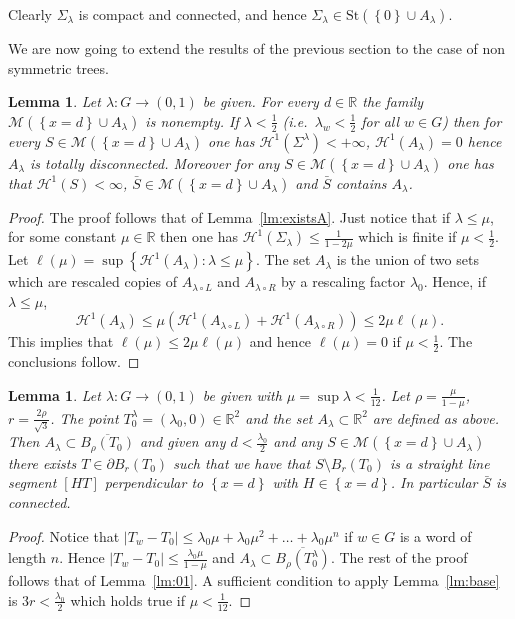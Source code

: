 \documentclass{amsart}
\newcommand{\RR}{\mathbb R}
\renewcommand{\H}{\mathcal H}
\newcommand{\abs}[1]{\left\vert #1 \right\vert}
\newcommand{\ENCLOSE}[1]{\left\{#1\right\}}
\newcommand{\St}{\mathrm{St}}
\newcommand{\M}{\mathcal{M}}
\renewcommand{\H}{\mathcal{H}}
\newtheorem{lemma}[theorem]{Lemma}
\theoremstyle{definition}
\theoremstyle{remark}
\begin{document}
Clearly $\Sigma_\lambda$ is compact and connected, 
and hence $\Sigma_\lambda\in \St(\ENCLOSE{0}\cup A_\lambda)$.

We are now going to extend the results of the previous section to the case of non symmetric trees.
\begin{lemma}\label{lm2:existsA} 
  Let $\lambda\colon G\to (0,1)$ be given.
  For every $d\in \RR$ the family $\M(\ENCLOSE{x=d}\cup A_\lambda)$ is nonempty.
  If $\lambda < \frac 1 2$ (i.e.\ $\lambda_w < \frac 1 2$ for all $w\in G$)
  then for every $S\in \M(\ENCLOSE{x=d}\cup A_\lambda)$
  one has $\H^1(\Sigma^\lambda)<+\infty$, $\H^1(A_\lambda)=0$ hence $A_\lambda$ is totally disconnected.
  Moreover for any $S \in \M(\ENCLOSE{x=d}\cup A_\lambda)$ 
  one has that $\H^1(S)<\infty$,
  $\bar S\in \M(\ENCLOSE{x=d}\cup A_\lambda)$ and
  $\bar S$ contains $A_\lambda$.
\end{lemma}
\begin{proof}
  The proof follows that of Lemma~\ref{lm:existsA}. 
  Just notice that if $\lambda \le \mu$, for some constant 
  $\mu\in \RR$ then one has 
  $\H^1(\Sigma_\lambda)\le \frac{1}{1-2\mu}$ which is 
  finite if $\mu<\frac 1 2$.
  Let $\ell(\mu)=\sup\ENCLOSE{\H^1(A_\lambda)\colon \lambda \le \mu}$.
  The set $A_\lambda$ is the union 
  of two sets which are rescaled copies of $A_{\lambda\circ L}$ and $A_{\lambda\circ R}$
  by a rescaling factor $\lambda_0$.
  Hence, if $\lambda \le \mu$, 
  \[
    \H^1(A_\lambda) \le \mu (\H^1(A_{\lambda\circ L}) + \H^1(A_{\lambda\circ R}))
    \le 2\mu \ell(\mu).
  \]
  This implies that $\ell(\mu)\le 2\mu \ell(\mu)$ and hence $\ell(\mu)=0$ 
  if $\mu< \frac 1 2$.  
  The conclusions follow.
\end{proof}

\begin{lemma}\label{lm2:01}
Let $\lambda\colon G\to (0,1)$ be given 
with $\mu=\sup \lambda < \frac 1 {12}$.
Let $\rho = \frac{\mu}{1-\mu}$,
$r=\frac{2\rho}{\sqrt 3}$.
The point $T_0^\lambda=(\lambda_0,0)\in\RR^2$ and the 
set $A_\lambda\subset \RR^2$ are defined as above.
Then $A_\lambda\subset \overline{B_\rho(T_0)}$ and 
given any $d<\frac {\lambda_0} 2$ and any
$S\in \M(\ENCLOSE{x=d}\cup A_\lambda)$ 
there exists $T\in \partial B_r(T_0)$ such that
we have that $S\setminus B_r(T_0)$ is a straight line segment
$[HT]$ perpendicular to $\ENCLOSE{x=d}$ 
with $H\in \ENCLOSE{x=d}$.
In particular $\bar S$ is connected.
\end{lemma}
%
\begin{proof}
  Notice that $\abs{T_w-T_0} \le \lambda_0\mu + \lambda_0\mu^2 + \dots + \lambda_0\mu^n$ 
  if $w\in G$ is a word of length $n$. 
  Hence $\abs{T_w-T_0}\le \frac{\lambda_0\mu}{1-\mu}$
  and $A_\lambda\subset \overline{B_\rho(T^\lambda_0)}$.
  The rest of the proof follows that of Lemma~\ref{lm:01}.
  A sufficient condition to apply Lemma~\ref{lm:base} is 
  $3r < \frac{\lambda_0}{2}$ which holds true if $\mu < \frac 1 {12}$.
\end{proof}
\end{document}
